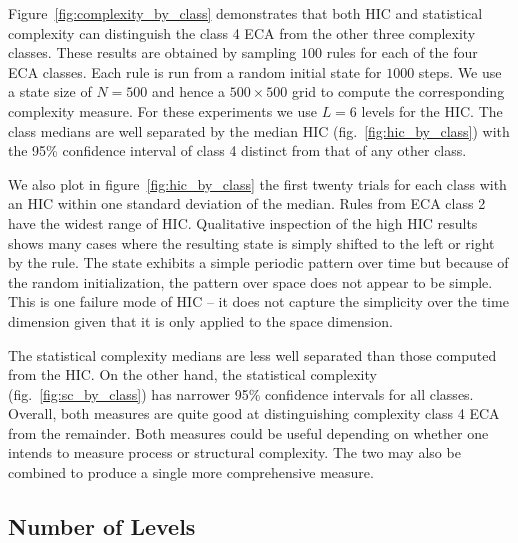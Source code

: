 Figure~\ref{fig:complexity_by_class} demonstrates that both HIC and statistical
complexity can distinguish the class 4 ECA from the other three complexity
classes. These results are obtained by sampling $100$ rules for each of the
four ECA classes. Each rule is run from a random initial state for $1000$
steps. We use a state size of $N\!=\!500$ and hence a $500 \times 500$ grid to
compute the corresponding complexity measure. For these experiments we use
$L=6$ levels for the HIC. The class medians are well separated by the median
HIC (fig.~\ref{fig:hic_by_class}) with the 95\% confidence interval of class 4
distinct from that of any other class.

We also plot in figure~\ref{fig:hic_by_class} the first twenty trials for each
class with an HIC within one standard deviation of the median. Rules from ECA
class 2 have the widest range of HIC. Qualitative inspection of the high HIC
results shows many cases where the resulting state is simply shifted to the
left or right by the rule. The state exhibits a simple periodic pattern over
time but because of the random initialization, the pattern over space does not
appear to be simple. This is one failure mode of HIC -- it does not
capture the simplicity over the time dimension given that it is only applied to
the space dimension.

The statistical complexity medians are less well separated than those computed
from the HIC. On the other hand, the statistical complexity
(fig.~\ref{fig:sc_by_class}) has narrower 95\% confidence intervals for all
classes. Overall, both measures are quite good at distinguishing complexity
class 4 ECA from the remainder. Both measures could be useful depending on
whether one intends to measure process or structural complexity. The two may
also be combined to produce a single more comprehensive measure.

\subsection{Number of Levels}

